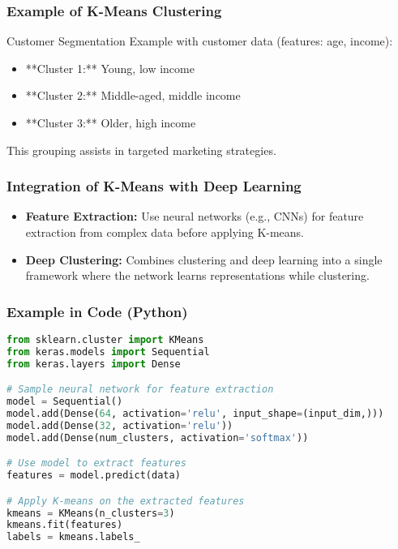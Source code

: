 \documentclass[aspectratio=169]{beamer}
\begin{document}
\begin{frame}[fragile]
    \frametitle{Example of K-Means Clustering}
    \begin{block}{Customer Segmentation}
        Example with customer data (features: age, income):
        \begin{itemize}
            \item **Cluster 1:** Young, low income
            \item **Cluster 2:** Middle-aged, middle income
            \item **Cluster 3:** Older, high income
        \end{itemize}
        This grouping assists in targeted marketing strategies.
    \end{block}
\end{frame}

\begin{frame}[fragile]
    \frametitle{Integration of K-Means with Deep Learning}
    \begin{itemize}
        \item \textbf{Feature Extraction:} Use neural networks (e.g., CNNs) for feature extraction from complex data before applying K-means.
        
        \item \textbf{Deep Clustering:} Combines clustering and deep learning into a single framework where the network learns representations while clustering.
    \end{itemize}
\end{frame}

\begin{frame}[fragile]
    \frametitle{Example in Code (Python)}
    \begin{lstlisting}[language=Python]
from sklearn.cluster import KMeans
from keras.models import Sequential
from keras.layers import Dense

# Sample neural network for feature extraction
model = Sequential()
model.add(Dense(64, activation='relu', input_shape=(input_dim,)))
model.add(Dense(32, activation='relu'))
model.add(Dense(num_clusters, activation='softmax'))

# Use model to extract features
features = model.predict(data)

# Apply K-means on the extracted features
kmeans = KMeans(n_clusters=3)
kmeans.fit(features)
labels = kmeans.labels_
    \end{lstlisting}
\end{frame}
\end{document}
